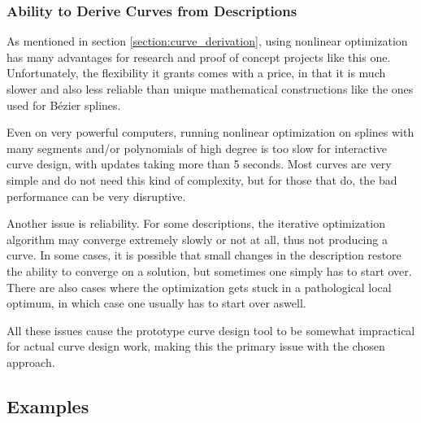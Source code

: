 \documentclass[a4paper]{article}
\begin{document}
			\subsubsection{Ability to Derive Curves from Descriptions}
			\label{section:ability_derive_curves_descriptions}

				As mentioned in section \ref{section:curve_derivation}, using nonlinear optimization has many advantages for research and proof of concept projects like this one. Unfortunately, the flexibility it grants comes with a price, in that it is much slower and also less reliable than unique mathematical constructions like the ones used for Bézier splines.

				Even on very powerful computers, running nonlinear optimization on splines with many segments and/or polynomials of high degree is too slow for interactive curve design, with updates taking more than 5 seconds. Most curves are very simple and do not need this kind of complexity, but for those that do, the bad performance can be very disruptive.

				Another issue is reliability. For some descriptions, the iterative optimization algorithm may converge extremely slowly or not at all, thus not producing a curve. In some cases, it is possible that small changes in the description restore the ability to converge on a solution, but sometimes one simply has to start over. There are also cases where the optimization gets stuck in a pathological local optimum, in which case one usually has to start over aswell.

				All these issues cause the prototype curve design tool to be somewhat impractical for actual curve design work, making this the primary issue with the chosen approach.

		\subsection{Examples}
		\label{section:examples}

\end{document}
